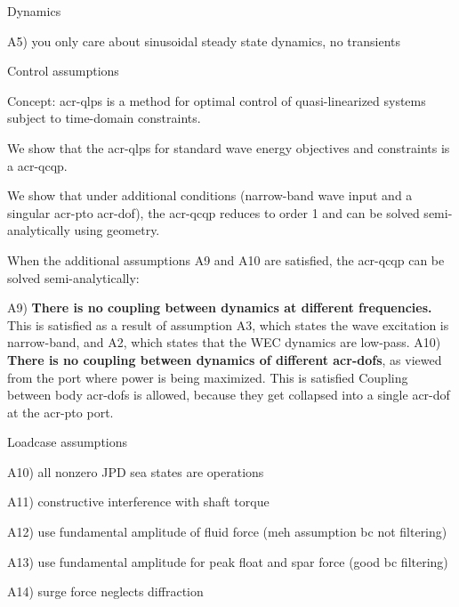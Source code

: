 
Dynamics

A5) you only care about sinusoidal steady state dynamics, no transients

Control assumptions

Concept:
\gls{acr-qlps} is a method for optimal control of quasi-linearized systems subject to time-domain constraints.

We show that the \gls{acr-qlps} for standard wave energy objectives and constraints is a \gls{acr-qcqp}.

We show that under additional conditions (narrow-band wave input and a singular \gls{acr-pto} \gls{acr-dof}), the \gls{acr-qcqp} reduces to order 1 and can be solved semi-analytically using geometry.


When the additional assumptions A9 and A10 are satisfied, the \gls{acr-qcqp} can be solved semi-analytically:
\begin{itemize}
A9) \textbf{There is no coupling between dynamics at different frequencies.}
This is satisfied as a result of assumption A3, which states the wave excitation is narrow-band, and A2, which states that the WEC dynamics are low-pass.
A10) \textbf{There is no coupling between dynamics of different \glspl{acr-dof}}, as viewed from the port where power is being maximized.
This is satisfied 
Coupling between body \glspl{acr-dof} is allowed, because they get collapsed into a single \gls{acr-dof} at the \gls{acr-pto} port.
\end{itemize}







Loadcase assumptions

A10) all nonzero JPD sea states are operations

A11) constructive interference with shaft torque

A12) use fundamental amplitude of fluid force (meh assumption bc not filtering)

A13) use fundamental amplitude for peak float and spar force (good bc filtering)

A14) surge force neglects diffraction